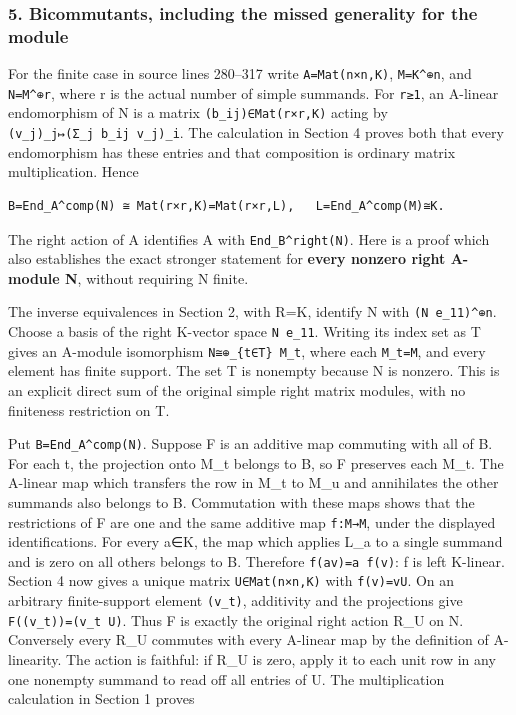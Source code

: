 \subsubsection{5. Bicommutants, including the missed generality for the module}\label{bicommutants-including-the-missed-generality-for-the-module}

For the finite case in source lines 280--317 write \texttt{A=Mat(n×n,K)}, \texttt{M=K\^{}⊕n}, and \texttt{N=M\^{}⊕r}, where r is the actual number of simple summands. For \texttt{r≥1}, an A-linear endomorphism of N is a matrix \texttt{(b\_ij)∈Mat(r×r,K)} acting by \texttt{(v\_j)\_j↦(Σ\_j\ b\_ij\ v\_j)\_i}. The calculation in Section 4 proves both that every endomorphism has these entries and that composition is ordinary matrix multiplication. Hence

\begin{verbatim}
B=End_A^comp(N) ≅ Mat(r×r,K)=Mat(r×r,L),   L=End_A^comp(M)≅K.
\end{verbatim}

The right action of A identifies A with \texttt{End\_B\^{}right(N)}. Here is a proof which also establishes the exact stronger statement for \textbf{every nonzero right A-module N}, without requiring N finite.

The inverse equivalences in Section 2, with R=K, identify N with \texttt{(N\ e\_11)\^{}⊕n}. Choose a basis of the right K-vector space \texttt{N\ e\_11}. Writing its index set as T gives an A-module isomorphism \texttt{N≅⊕\_\{t∈T\}\ M\_t}, where each \texttt{M\_t=M}, and every element has finite support. The set T is nonempty because N is nonzero. This is an explicit direct sum of the original simple right matrix modules, with no finiteness restriction on T.

Put \texttt{B=End\_A\^{}comp(N)}. Suppose F is an additive map commuting with all of B. For each t, the projection onto M\_t belongs to B, so F preserves each M\_t. The A-linear map which transfers the row in M\_t to M\_u and annihilates the other summands also belongs to B. Commutation with these maps shows that the restrictions of F are one and the same additive map \texttt{f:M→M}, under the displayed identifications. For every a∈K, the map which applies L\_a to a single summand and is zero on all others belongs to B. Therefore \texttt{f(av)=a\ f(v)}: f is left K-linear. Section 4 now gives a unique matrix \texttt{U∈Mat(n×n,K)} with \texttt{f(v)=vU}. On an arbitrary finite-support element \texttt{(v\_t)}, additivity and the projections give \texttt{F((v\_t))=(v\_t\ U)}. Thus F is exactly the original right action R\_U on N. Conversely every R\_U commutes with every A-linear map by the definition of A-linearity. The action is faithful: if R\_U is zero, apply it to each unit row in any one nonempty summand to read off all entries of U. The multiplication calculation in Section 1 proves

